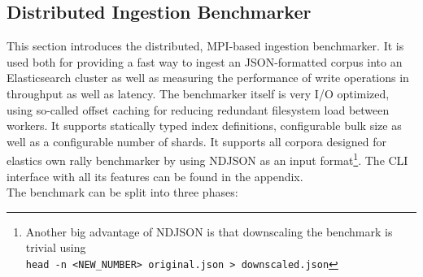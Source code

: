 \newpage

\subsection{Distributed Ingestion Benchmarker}
This section introduces the distributed, \ac{MPI}-based ingestion benchmarker. It is used both for providing a fast way to ingest an \ac{JSON}-formatted corpus into an Elasticsearch cluster as well as measuring the performance of write operations in throughput as well as latency. The benchmarker itself is very I/O optimized, using so-called offset caching for reducing redundant filesystem load between workers. It supports statically typed index definitions, configurable bulk size as well as a configurable number of shards. It supports all corpora designed for elastics own rally benchmarker by using \ac{NDJSON} as an input format\footnote{Another big advantage of \ac{NDJSON} is that downscaling the benchmark is trivial using\\\texttt{head -n <NEW\_NUMBER> original.json > downscaled.json}}. The \ac{CLI} interface with all its features can be found in the appendix.\\

The benchmark can be split into three phases:

